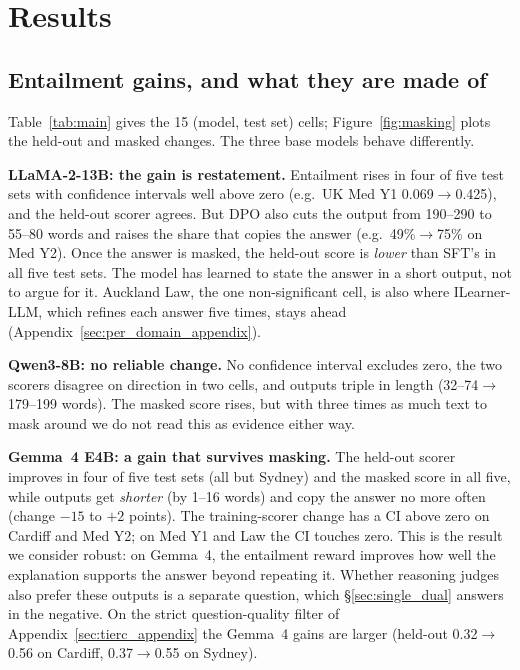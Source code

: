 \section{Results}
\label{sec:results}

\subsection{Entailment gains, and what they are made of}
\label{sec:main_results}



Table~\ref{tab:main} gives the 15 (model, test set) cells; Figure~\ref{fig:masking} plots the held-out and masked changes. The three base models behave differently.

\textbf{LLaMA-2-13B: the gain is restatement.} Entailment rises in four of five test sets with confidence intervals well above zero (e.g.\ UK Med Y1 0.069$\to$0.425), and the held-out scorer agrees. But DPO also cuts the output from 190--290 to 55--80 words and raises the share that copies the answer (e.g.\ 49\%$\to$75\% on Med Y2). Once the answer is masked, the held-out score is \emph{lower} than SFT's in all five test sets. The model has learned to state the answer in a short output, not to argue for it. Auckland Law, the one non-significant cell, is also where ILearner-LLM, which refines each answer five times, stays ahead (Appendix~\ref{sec:per_domain_appendix}).

\textbf{Qwen3-8B: no reliable change.} No confidence interval excludes zero, the two scorers disagree on direction in two cells, and outputs triple in length (32--74$\to$179--199 words). The masked score rises, but with three times as much text to mask around we do not read this as evidence either way.

\textbf{Gemma~4 E4B: a gain that survives masking.} The held-out scorer improves in four of five test sets (all but Sydney) and the masked score in all five, while outputs get \emph{shorter} (by 1--16 words) and copy the answer no more often (change $-15$ to $+2$ points). The training-scorer change has a CI above zero on Cardiff and Med Y2; on Med Y1 and Law the CI touches zero. This is the result we consider robust: on Gemma~4, the entailment reward improves how well the explanation supports the answer beyond repeating it. Whether reasoning judges also prefer these outputs is a separate question, which \S\ref{sec:single_dual} answers in the negative. On the strict question-quality filter of Appendix~\ref{sec:tierc_appendix} the Gemma~4 gains are larger (held-out 0.32$\to$0.56 on Cardiff, 0.37$\to$0.55 on Sydney).

